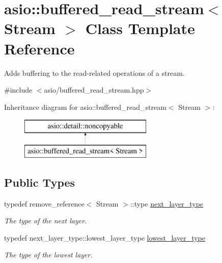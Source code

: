 \hypertarget{classasio_1_1buffered__read__stream}{}\section{asio\+:\+:buffered\+\_\+read\+\_\+stream$<$ Stream $>$ Class Template Reference}
\label{classasio_1_1buffered__read__stream}


Adds buffering to the read-\/related operations of a stream.  




{\ttfamily \#include $<$asio/buffered\+\_\+read\+\_\+stream.\+hpp$>$}

Inheritance diagram for asio\+:\+:buffered\+\_\+read\+\_\+stream$<$ Stream $>$\+:\begin{figure}[H]
\begin{center}
\leavevmode
\includegraphics[height=2.000000cm]{classasio_1_1buffered__read__stream}
\end{center}
\end{figure}
\subsection*{Public Types}
\begin{DoxyCompactItemize}
\item 
typedef remove\+\_\+reference$<$ Stream $>$\+::type \hyperlink{classasio_1_1buffered__read__stream_a9f1f181db6c3207bd4c1c8fe6642d531}{next\+\_\+layer\+\_\+type}
\begin{DoxyCompactList}\small\item\em The type of the next layer. \end{DoxyCompactList}\item 
typedef next\+\_\+layer\+\_\+type\+::lowest\+\_\+layer\+\_\+type \hyperlink{classasio_1_1buffered__read__stream_a041a7cecfeb013857bd1839dcd43de49}{lowest\+\_\+layer\+\_\+type}
\begin{DoxyCompactList}\small\item\em The type of the lowest layer. \end{DoxyCompactList}\end{DoxyCompactItemize}
